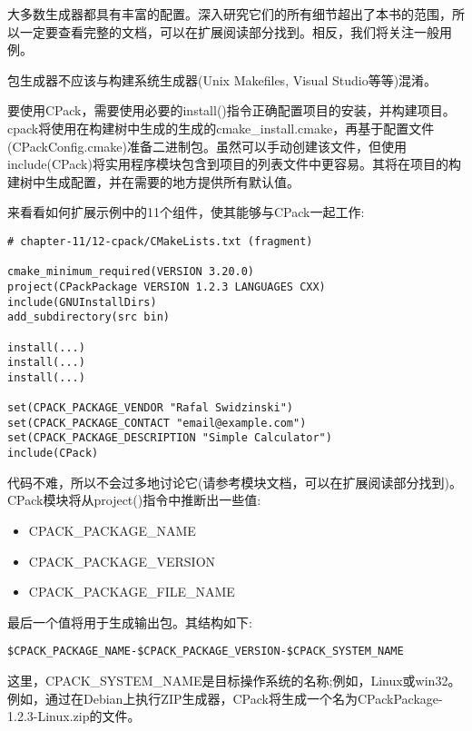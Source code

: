 大多数生成器都具有丰富的配置。深入研究它们的所有细节超出了本书的范围，所以一定要查看完整的文档，可以在扩展阅读部分找到。相反，我们将关注一般用例。

\begin{tcolorbox}[colback=blue!5!white,colframe=blue!75!black,title=Note]
包生成器不应该与构建系统生成器(Unix Makefiles, Visual Studio等等)混淆。
\end{tcolorbox}

要使用CPack，需要使用必要的install()指令正确配置项目的安装，并构建项目。cpack将使用在构建树中生成的生成的cmake\_install.cmake，再基于配置文件(CPackConfig.cmake)准备二进制包。虽然可以手动创建该文件，但使用include(CPack)将实用程序模块包含到项目的列表文件中更容易。其将在项目的构建树中生成配置，并在需要的地方提供所有默认值。

来看看如何扩展示例中的11个组件，使其能够与CPack一起工作:

\begin{lstlisting}[style=styleCMake]
# chapter-11/12-cpack/CMakeLists.txt (fragment)

cmake_minimum_required(VERSION 3.20.0)
project(CPackPackage VERSION 1.2.3 LANGUAGES CXX)
include(GNUInstallDirs)
add_subdirectory(src bin)

install(...)
install(...)
install(...)

set(CPACK_PACKAGE_VENDOR "Rafal Swidzinski")
set(CPACK_PACKAGE_CONTACT "email@example.com")
set(CPACK_PACKAGE_DESCRIPTION "Simple Calculator")
include(CPack)
\end{lstlisting}

代码不难，所以不会过多地讨论它(请参考模块文档，可以在扩展阅读部分找到)。CPack模块将从project()指令中推断出一些值:

\begin{itemize}
\item 
CPACK\_PACKAGE\_NAME

\item 
CPACK\_PACKAGE\_VERSION

\item 
CPACK\_PACKAGE\_FILE\_NAME
\end{itemize}

最后一个值将用于生成输出包。其结构如下:

\begin{lstlisting}[style=styleCMake]
$CPACK_PACKAGE_NAME-$CPACK_PACKAGE_VERSION-$CPACK_SYSTEM_NAME
\end{lstlisting}

这里，CPACK\_SYSTEM\_NAME是目标操作系统的名称;例如，Linux或win32。例如，通过在Debian上执行ZIP生成器，CPack将生成一个名为CPackPackage-1.2.3-Linux.zip的文件。

